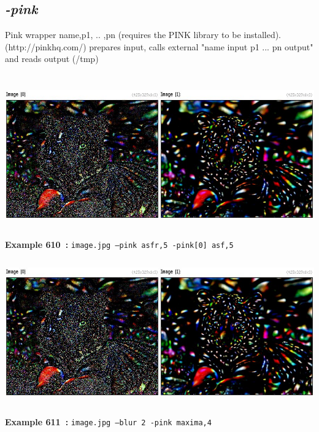 \documentclass[a4paper,11pt,twoside]{book}
\begin{document}
\subsection{\emph{-pink} }\vspace*{-0.5em}
Pink wrapper name,p1, .. ,pn (requires the PINK library to be installed).
~\\(http://pinkhq.com/)
prepares input, calls external "name input p1 ... pn output" and reads output (/tmp)
\begin{center}\includegraphics[keepaspectratio=true,height=7cm,width=\textwidth]{img/gmic_def610.jpg}\\
{\footnotesize \textbf{Example 610~:} \texttt{image.jpg --pink asfr,5 -pink[0] asf,5}}
\\\includegraphics[keepaspectratio=true,height=7cm,width=\textwidth]{img/gmic_def611.jpg}\\
{\footnotesize \textbf{Example 611~:} \texttt{image.jpg --blur 2 -pink maxima,4}}
\end{center}
\end{document}
